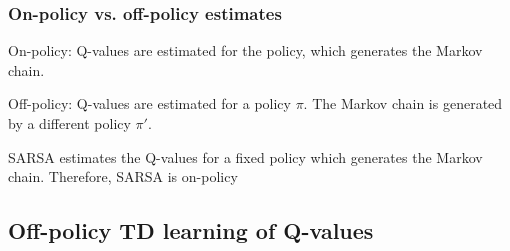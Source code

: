 \begin{frame} \frametitle{On-policy vs. off-policy estimates}
	\begin{block}{On-policy:}
		Q-values are estimated for the policy, which generates the Markov chain.
	\end{block}
	
	\vspace{5mm}
	
	\begin{block}{Off-policy:}
		Q-values are estimated for a policy $\pi$. The Markov chain is generated by a different policy $\pi'$.
	\end{block}
	
	\pause
	
	
	SARSA estimates the Q-values for a fixed policy which generates the Markov chain. Therefore, SARSA is on-policy
\end{frame}

\subsection{Off-policy TD learning of Q-values}

